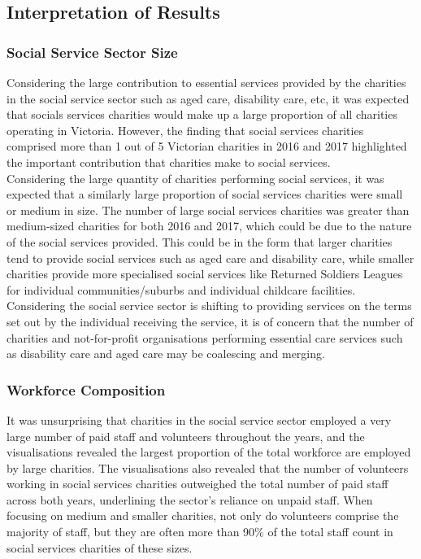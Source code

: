 \documentclass[
  11pt,
]{article}
\begin{document}
\newpage

\hypertarget{interpretation-of-results}{%
\subsection{Interpretation of Results}\label{interpretation-of-results}}

\hypertarget{social-service-sector-size-1}{%
\subsubsection{Social Service Sector Size}\label{social-service-sector-size-1}}

Considering the large contribution to essential services provided by the charities in the social service sector such as aged care, disability care, etc, it was expected that socials services charities would make up a large proportion of all charities operating in Victoria. However, the finding that social services charities comprised more than 1 out of 5 Victorian charities in 2016 and 2017 highlighted the important contribution that charities make to social services.\\
Considering the large quantity of charities performing social services, it was expected that a similarly large proportion of social services charities were small or medium in size. The number of large social services charities was greater than medium-sized charities for both 2016 and 2017, which could be due to the nature of the social services provided. This could be in the form that larger charities tend to provide social services such as aged care and disability care, while smaller charities provide more specialised social services like Returned Soldiers Leagues for individual communities/suburbs and individual childcare facilities. Considering the social service sector is shifting to providing services on the terms set out by the individual receiving the service, it is of concern that the number of charities and not-for-profit organisations performing essential care services such as disability care and aged care may be coalescing and merging.

\hypertarget{workforce-composition-1}{%
\subsubsection{Workforce Composition}\label{workforce-composition-1}}

It was unsurprising that charities in the social service sector employed a very large number of paid staff and volunteers throughout the years, and the visualisations revealed the largest proportion of the total workforce are employed by large charities. The visualisations also revealed that the number of volunteers working in social services charities outweighed the total number of paid staff across both years, underlining the sector's reliance on unpaid staff. When focusing on medium and smaller charities, not only do volunteers comprise the majority of staff, but they are often more than 90\% of the total staff count in social services charities of these sizes.
\end{document}
